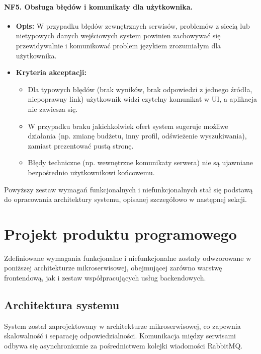 \documentclass[12pt,a4paper]{article}
\begin{document}
\paragraph{NF5. Obsługa błędów i komunikaty dla użytkownika.}
\begin{itemize}
  
    \item \textbf{Opis:} W przypadku błędów zewnętrznych serwisów, problemów z siecią lub nietypowych danych wejściowych system powinien zachowywać się przewidywalnie i komunikować problem językiem zrozumiałym dla użytkownika.
    \item \textbf{Kryteria akceptacji:}
    \begin{itemize}
        \item Dla typowych błędów (brak wyników, brak odpowiedzi z jednego źródła, niepoprawny link) użytkownik widzi czytelny komunikat w UI, a aplikacja nie zawiesza się.
        \item W przypadku braku jakichkolwiek ofert system sugeruje możliwe działania (np. zmianę budżetu, inny profil, odświeżenie wyszukiwania), zamiast prezentować pustą stronę.
        \item Błędy techniczne (np. wewnętrzne komunikaty serwera) nie są ujawniane bezpośrednio użytkownikowi końcowemu.
    \end{itemize}
\end{itemize}

Powyższy zestaw wymagań funkcjonalnych i niefunkcjonalnych stał się podstawą do opracowania architektury systemu, opisanej szczegółowo w następnej sekcji.

\section{Projekt produktu programowego}

Zdefiniowane wymagania funkcjonalne i niefunkcjonalne zostały odwzorowane w poniższej architekturze mikroserwisowej, obejmującej zarówno warstwę frontendową, jak i zestaw współpracujących usług backendowych.

\subsection{Architektura systemu}
System został zaprojektowany w architekturze mikroserwisowej, co zapewnia skalowalność i separację odpowiedzialności. Komunikacja między serwisami odbywa się asynchronicznie za pośrednictwem kolejki wiadomości RabbitMQ.
\end{document}
